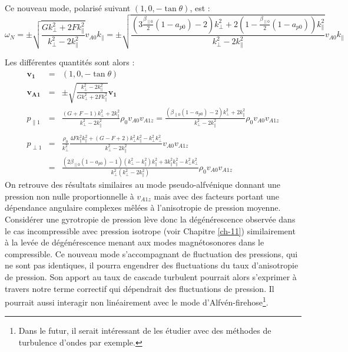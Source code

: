 Ce nouveau mode, polarisé suivant $(1,0,-\tan \theta)$, est : 
\begin{equation}
    \omega_N = \pm \sqrt{ \frac{G k^2_{\perp} + 2F k^2_{\parallel}}{k^2_{\perp}  - 2 k^2_{\parallel}}} v_{A0} k_{\parallel}= \pm \sqrt{ \frac{(3\frac{\beta_{\parallel 0}}{2} (1-a_{p0}) -2) k^2_{\perp} + 2( 1 - \frac{\beta_{\parallel 0}}{2} (1-a_{p0})) k^2_{\parallel}}{k^2_{\perp}  - 2 k^2_{\parallel}}} v_{A0} k_{\parallel} 
\end{equation} 

Les différentes quantités sont alors : 
\begin{eqnarray}
\boldsymbol{v_{1}} &=& (1,0,-\tan \theta)\\
  \boldsymbol{v_{A1}} &=&  \pm  \sqrt{ \frac{k^2_{\perp}  - 2 k^2_{\parallel}}{G k^2_{\perp} + 2F k^2_{\parallel}}} \boldsymbol{v_1} \\
   p_{\parallel 1} &=& \frac{(G + F - 1) k^2_{\perp}  + 2 k^2_{\parallel} }{k^2_{\perp}  - 2 k^2_{\parallel}}   \rho_0 v_{A0}v_{A1z} = \frac{(\beta_{\parallel 0} (1-a_{p0}) -2 ) k^2_{\perp}  + 2 k^2_{\parallel} }{k^2_{\perp}  - 2 k^2_{\parallel}}   \rho_0 v_{A0}v_{A1z} \nonumber\\ && \\
   p_{\perp 1} &=& \frac{\rho_0}{k^2_{\perp} }  \frac{4F k^2_{\parallel} k^2_{\parallel} +(G  - F + 2 )k^2_{\perp} k^2_{\parallel}- k^2_{\perp} k^2_{\perp}  }{k^2_{\perp}  - 2 k^2_{\parallel}} v_{A0}v_{A1z} \nonumber\\
   &=&    \frac{(2\beta_{\parallel 0} (1-a_{p0})  -  1   )(k^2_{\perp}  -  k^2_{\parallel}) k^2_{\parallel} + 3k^2_{\parallel}k^2_{\parallel} - k^2_{\perp} k^2_{\perp}  }{k^2_{\perp} (k^2_{\perp}  - 2 k^2_{\parallel})}\rho_0 v_{A0}v_{A1z} 
\end{eqnarray}
On retrouve des résultats similaires au mode pseudo-alfvénique donnant une pression non nulle proportionnelle à $v_{A1z}$ mais avec des facteurs portant une dépendance angulaire complexes mêlées à l'anisotropie de pression moyenne.  Considérer une gyrotropie de pression lève donc la dégénérescence observée dans le cas incompressible avec pression isotrope (voir Chapitre \ref{ch-11}) similairement à la levée de dégénérescence menant aux modes magnétosonores dans le compressible. Ce nouveau mode s'accompagnant de fluctuation des pressions, qui ne sont pas identiques, il pourra engendrer des fluctuations du taux d'anisotropie de pression. Son apport au taux de cascade turbulent pourrait alors s'exprimer à travers notre terme correctif qui dépendrait des fluctuations de pression. Il pourrait aussi interagir non linéairement avec le mode d'Alfvén-firehose\footnote{Dans le futur, il serait intéressant de les étudier avec des méthodes de turbulence d'ondes par exemple.}. 

